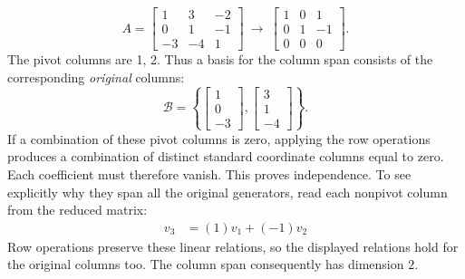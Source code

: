 \[A=\left[\begin{array}{rrr}1&3&-2\\0&1&-1\\-3&-4&1\end{array}\right]\ \longrightarrow\ \left[\begin{array}{rrr}1&0&1\\0&1&-1\\0&0&0\end{array}\right].\]
The pivot columns are 1, 2. Thus a basis for the column span consists of the corresponding \emph{original} columns:
\[\mathcal B=\left\{\left[\begin{array}{r}1\\0\\-3\end{array}\right],\left[\begin{array}{r}3\\1\\-4\end{array}\right]\right\}.\]
If a combination of these pivot columns is zero, applying the row operations produces a combination of distinct standard coordinate columns equal to zero. Each coefficient must therefore vanish. This proves independence. To see explicitly why they span all the original generators, read each nonpivot column from the reduced matrix:
\[\begin{aligned}v_{3}&=(1)v_{1}+(-1)v_{2}\end{aligned}\]
Row operations preserve these linear relations, so the displayed relations hold for the original columns too. The column span consequently has dimension $2$.

